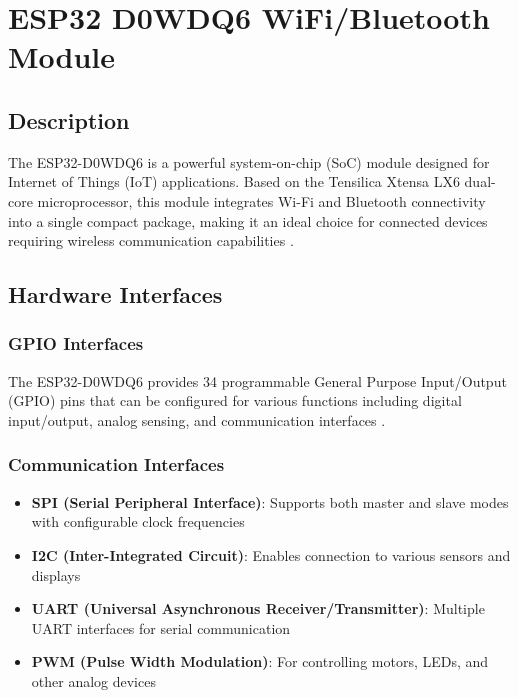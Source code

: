 %
%

\chapter{ESP32 D0WDQ6 WiFi/Bluetooth Module}

\section{Description}

The ESP32-D0WDQ6 is a powerful system-on-chip (SoC) module designed for Internet of Things (IoT) applications. Based on the Tensilica Xtensa LX6 dual-core microprocessor, this module integrates Wi-Fi and Bluetooth connectivity into a single compact package, making it an ideal choice for connected devices requiring wireless communication capabilities \cite{Espressif:2023}.

\section{Hardware Interfaces}

\subsection{GPIO Interfaces}
The ESP32-D0WDQ6 provides 34 programmable General Purpose Input/Output (GPIO) pins that can be configured for various functions including digital input/output, analog sensing, and communication interfaces \cite{Espressif:2023}.

\subsection{Communication Interfaces}
\begin{itemize}
	\item \textbf{SPI (Serial Peripheral Interface)}: Supports both master and slave modes with configurable clock frequencies
	\item \textbf{I2C (Inter-Integrated Circuit)}: Enables connection to various sensors and displays
	\item \textbf{UART (Universal Asynchronous Receiver/Transmitter)}: Multiple UART interfaces for serial communication
	\item \textbf{PWM (Pulse Width Modulation)}: For controlling motors, LEDs, and other analog devices
\end{itemize}

